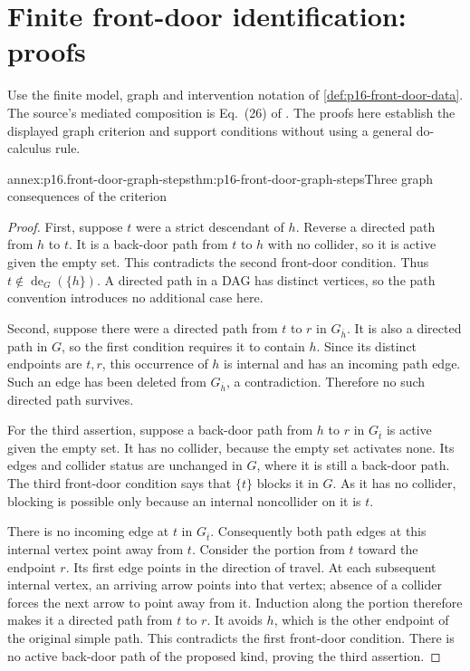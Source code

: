 \section{Finite front-door identification: proofs}
\label{sec:annex-p16-front-door-identification}

Use the finite model, graph and intervention notation of
\cref{def:p16-front-door-data}. The source's mediated composition is
Eq.~(26) of \cite[sec.~3.3.2, p.~116]{Pearl2009CausalOverview}.
The proofs here establish the displayed graph criterion and support
conditions without using a general do-calculus rule.

\begin{annexitem}{annex:p16.front-door-graph-steps}{thm:p16-front-door-graph-steps}{Three graph consequences of the criterion}
\begin{proof}
First, suppose \(t\) were a strict descendant of \(h\). Reverse
a directed path from \(h\) to \(t\). It is a back-door path
from \(t\) to \(h\) with no collider, so it is active given
the empty set. This contradicts the second front-door condition.
Thus \(t\notin\operatorname{de}_G(\{h\})\). A directed path
in a DAG has distinct vertices, so the path convention introduces
no additional case here.

Second, suppose there were a directed path from \(t\) to \(r\)
in \(G_{\overline h}\). It is also a directed path in \(G\),
so the first condition requires it to contain \(h\). Since its
distinct endpoints are \(t,r\), this occurrence of \(h\) is
internal and has an incoming path edge. Such an edge has been deleted
from \(G_{\overline h}\), a contradiction. Therefore no such
directed path survives.

For the third assertion, suppose a back-door path from \(h\) to
\(r\) in \(G_{\overline t}\) is active given the empty set.
It has no collider, because the empty set activates none. Its edges
and collider status are unchanged in \(G\), where it is still a
back-door path. The third front-door condition says that \(\{t\}\)
blocks it in \(G\). As it has no collider, blocking is possible
only because an internal noncollider on it is \(t\).

There is no incoming edge at \(t\) in \(G_{\overline t}\).
Consequently both path edges at this internal vertex point away from
\(t\). Consider the portion from \(t\) toward the endpoint
\(r\). Its first edge points in the direction of travel. At each
subsequent internal vertex, an arriving arrow points into that vertex;
absence of a collider forces the next arrow to point away from it.
Induction along the portion therefore makes it a directed path from
\(t\) to \(r\). It avoids \(h\), which is the other endpoint
of the original simple path. This contradicts the first front-door
condition. There is no active back-door path of the proposed kind,
proving the third assertion.
\end{proof}
\end{annexitem}


